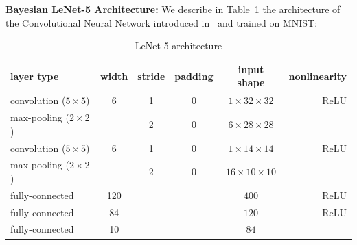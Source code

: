 \documentclass[11pt]{article}
\theoremstyle{t}
\begin{document}
 \textbf{Bayesian LeNet-5 Architecture:}
We describe in Table~\ref{table:lenet} the architecture of the Convolutional Neural Network introduced in~\citep{lecun1998gradient} and trained on MNIST:
\begin{table}[H]
\begin{center}
\begin{tabular}{ l c c c c r}
  \hline
  layer type & width & stride& padding & input shape& nonlinearity \\
  \hline
convolution ($5 \times 5$) & 6 & 1 & 0 & $1 \times 32 \times 32$ & ReLU \\
max-pooling ($2 \times 2$) &  & 2 & 0 & $6 \times 28 \times 28$ & \\
convolution ($5 \times 5$) & 6 & 1 & 0 & $1 \times 14 \times 14$ & ReLU \\
max-pooling ($2 \times 2$) &  & 2 & 0 & $16 \times 10 \times 10$ & \\
fully-connected & 120 &  &  & $400$ & ReLU \\
fully-connected & 84 &  &  & $ 120$ & ReLU \\
fully-connected & 10 &  &  & $ 84$ &  \\
  \hline
\end{tabular}
    \caption{LeNet-5 architecture}    \label{table:lenet}
\end{center}
\end{table}
\end{document}
